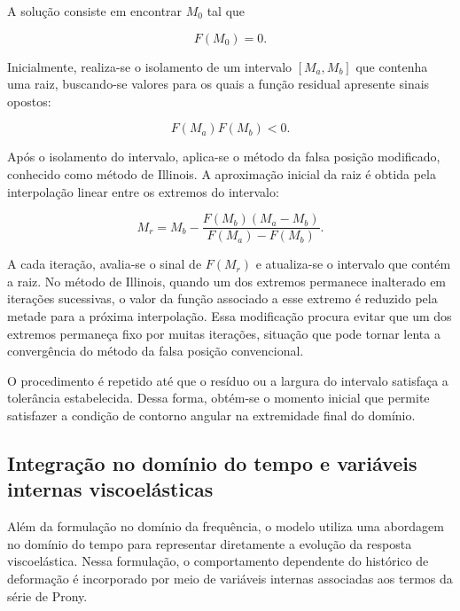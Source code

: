 \documentclass[arial,centeredequations,english,brazilian,oneside,section=TITLE]{ifes8}
\begin{document}
A solução consiste em encontrar $M_0$ tal que

\begin{equation}
  F(M_0)=0.
  \label{eq:condicao-momento}
\end{equation}

Inicialmente, realiza-se o isolamento de um intervalo
$[M_a,M_b]$ que contenha uma raiz, buscando-se valores para os
quais a função residual apresente sinais opostos:

\begin{equation}
  F(M_a)F(M_b)<0.
  \label{eq:intervalo-raiz}
\end{equation}

Após o isolamento do intervalo, aplica-se o método da falsa
posição modificado, conhecido como método de Illinois. A
aproximação inicial da raiz é obtida pela interpolação linear
entre os extremos do intervalo:

\begin{equation}
  M_r =
  M_b -
  \frac{F(M_b)(M_a-M_b)}
  {F(M_a)-F(M_b)}.
  \label{eq:falsa-posicao}
\end{equation}

A cada iteração, avalia-se o sinal de $F(M_r)$ e atualiza-se
o intervalo que contém a raiz. No método de Illinois, quando
um dos extremos permanece inalterado em iterações sucessivas,
o valor da função associado a esse extremo é reduzido pela
metade para a próxima interpolação. Essa modificação procura
evitar que um dos extremos permaneça fixo por muitas iterações,
situação que pode tornar lenta a convergência do método da
falsa posição convencional.

O procedimento é repetido até que o resíduo ou a largura do
intervalo satisfaça a tolerância estabelecida. Dessa forma,
obtém-se o momento inicial que permite satisfazer a condição
de contorno angular na extremidade final do domínio.

\subsection{Integração no domínio do tempo e variáveis internas
viscoelásticas}
\label{subsec:integracao-temporal}

Além da formulação no domínio da frequência, o modelo utiliza
uma abordagem no domínio do tempo para representar diretamente
a evolução da resposta viscoelástica. Nessa formulação, o
comportamento dependente do histórico de deformação é incorporado
por meio de variáveis internas associadas aos termos da série
de Prony.
\end{document}
